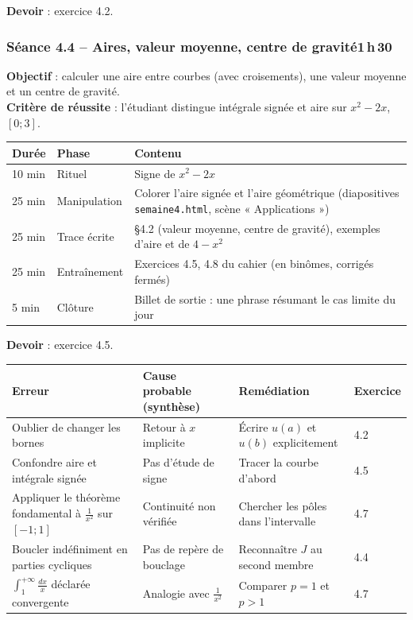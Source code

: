 \documentclass[10.5pt,a4paper]{article}
\newif\ifprof
\newcommand{\synth}{\textsf{\textcolor{ardoise}{(synthèse)}}}
\newcommand{\profonly}[1]{\ifprof #1\fi}
\begin{document}
\textbf{Devoir} : exercice 4.2.\profonly{ \textbf{Point de vigilance} : Ne pas appliquer le théorème fondamental à travers un pôle.}\par
{}\subsubsection*{\textcolor{marine}{Séance 4.4 -- Aires, valeur moyenne, centre de gravité}\hfill\normalfont\small\textcolor{ardoise}{1\,h\,30}}
\begin{objectif}\textbf{Objectif} : calculer une aire entre courbes (avec croisements), une valeur moyenne et un centre de gravité.\\\textbf{Critère de réussite} : l'étudiant distingue intégrale signée et aire sur $x^2-2x$, $[0;3]$.\end{objectif}\nopagebreak
\begin{longtable}{@{}p{1.1cm}p{2.4cm}p{12.4cm}@{}}
\toprule \textbf{Durée} & \textbf{Phase} & \textbf{Contenu}\\ \midrule\endhead
10 min & Rituel & Signe de $x^2-2x$\\
25 min & Manipulation & Colorer l'aire signée et l'aire géométrique (diapositives \texttt{semaine4.html}, scène « Applications »)\\
25 min & Trace écrite & \S4.2 (valeur moyenne, centre de gravité), exemples d'aire et de $4-x^2$\\
25 min & Entraînement & Exercices 4.5, 4.8 du cahier (en binômes, corrigés fermés)\\
5 min & Clôture & Billet de sortie : une phrase résumant le cas limite du jour\\ \bottomrule\end{longtable}\nopagebreak
\textbf{Devoir} : exercice 4.5.\profonly{ \textbf{Point de vigilance} : Découper aux changements de signe avant d'intégrer.}\par
\ifprof
\begin{longtable}{@{}p{4.8cm}p{3.6cm}p{4.9cm}p{1.6cm}@{}}
\toprule \textbf{Erreur} & \textbf{Cause probable \synth} & \textbf{Remédiation} & \textbf{Exercice}\\ \midrule\endhead
Oublier de changer les bornes & Retour à $x$ implicite & Écrire $u(a)$ et $u(b)$ explicitement & 4.2\\
Confondre aire et intégrale signée & Pas d'étude de signe & Tracer la courbe d'abord & 4.5\\
Appliquer le théorème fondamental à $\frac1{x^2}$ sur $[-1;1]$ & Continuité non vérifiée & Chercher les pôles dans l'intervalle & 4.7\\
Boucler indéfiniment en parties cycliques & Pas de repère de bouclage & Reconnaître $J$ au second membre & 4.4\\
$\int_1^{+\infty}\frac{dx}{x}$ déclarée convergente & Analogie avec $\frac1{x^2}$ & Comparer $p=1$ et $p>1$ & 4.7\\
\bottomrule\end{longtable}
\end{document}
